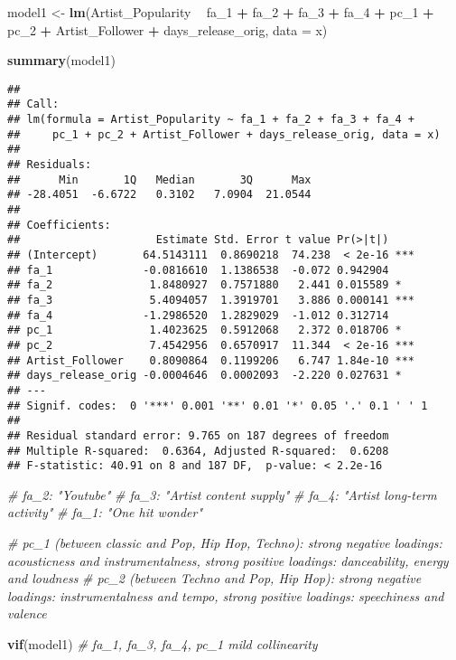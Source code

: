 \documentclass[
]{article}
\newenvironment{Shaded}{\begin{snugshade}}{\end{snugshade}}
\newcommand{\CommentTok}[1]{\textcolor[rgb]{0.56,0.35,0.01}{\textit{#1}}}
\newcommand{\DataTypeTok}[1]{\textcolor[rgb]{0.13,0.29,0.53}{#1}}
\newcommand{\DecValTok}[1]{\textcolor[rgb]{0.00,0.00,0.81}{#1}}
\newcommand{\KeywordTok}[1]{\textcolor[rgb]{0.13,0.29,0.53}{\textbf{#1}}}
\newcommand{\NormalTok}[1]{#1}
\newcommand{\OperatorTok}[1]{\textcolor[rgb]{0.81,0.36,0.00}{\textbf{#1}}}
\newcommand{\StringTok}[1]{\textcolor[rgb]{0.31,0.60,0.02}{#1}}
\begin{document}
\begin{Shaded}
\begin{Highlighting}[]
\NormalTok{model1 <-}\StringTok{ }\KeywordTok{lm}\NormalTok{(Artist_Popularity }\OperatorTok{~}\StringTok{ }\NormalTok{fa_}\DecValTok{1} \OperatorTok{+}\StringTok{ }\NormalTok{fa_}\DecValTok{2} \OperatorTok{+}\StringTok{ }\NormalTok{fa_}\DecValTok{3} \OperatorTok{+}\StringTok{ }\NormalTok{fa_}\DecValTok{4} \OperatorTok{+}\StringTok{ }\NormalTok{pc_}\DecValTok{1} \OperatorTok{+}\StringTok{ }\NormalTok{pc_}\DecValTok{2} \OperatorTok{+}\StringTok{ }\NormalTok{Artist_Follower }\OperatorTok{+}\StringTok{ }\NormalTok{days_release_orig, }\DataTypeTok{data =}\NormalTok{ x)}

\KeywordTok{summary}\NormalTok{(model1)}
\end{Highlighting}
\end{Shaded}

\begin{verbatim}
## 
## Call:
## lm(formula = Artist_Popularity ~ fa_1 + fa_2 + fa_3 + fa_4 + 
##     pc_1 + pc_2 + Artist_Follower + days_release_orig, data = x)
## 
## Residuals:
##      Min       1Q   Median       3Q      Max 
## -28.4051  -6.6722   0.3102   7.0904  21.0544 
## 
## Coefficients:
##                     Estimate Std. Error t value Pr(>|t|)    
## (Intercept)       64.5143111  0.8690218  74.238  < 2e-16 ***
## fa_1              -0.0816610  1.1386538  -0.072 0.942904    
## fa_2               1.8480927  0.7571880   2.441 0.015589 *  
## fa_3               5.4094057  1.3919701   3.886 0.000141 ***
## fa_4              -1.2986520  1.2829029  -1.012 0.312714    
## pc_1               1.4023625  0.5912068   2.372 0.018706 *  
## pc_2               7.4542956  0.6570917  11.344  < 2e-16 ***
## Artist_Follower    0.8090864  0.1199206   6.747 1.84e-10 ***
## days_release_orig -0.0004646  0.0002093  -2.220 0.027631 *  
## ---
## Signif. codes:  0 '***' 0.001 '**' 0.01 '*' 0.05 '.' 0.1 ' ' 1
## 
## Residual standard error: 9.765 on 187 degrees of freedom
## Multiple R-squared:  0.6364, Adjusted R-squared:  0.6208 
## F-statistic: 40.91 on 8 and 187 DF,  p-value: < 2.2e-16
\end{verbatim}

\begin{Shaded}
\begin{Highlighting}[]
\CommentTok{# fa_2: "Youtube"}
\CommentTok{# fa_3: "Artist content supply"}
\CommentTok{# fa_4: "Artist long-term activity"}
\CommentTok{# fa_1: "One hit wonder"}

\CommentTok{# pc_1 (between classic and Pop, Hip Hop, Techno): strong negative loadings: acousticness and instrumentalness, strong positive loadings: danceability, energy and loudness}
\CommentTok{# pc_2 (between Techno and Pop, Hip Hop): strong negative loadings: instrumentalness and tempo, strong positive loadings: speechiness and valence}

\KeywordTok{vif}\NormalTok{(model1) }\CommentTok{# fa_1, fa_3, fa_4, pc_1 mild collinearity}
\end{Highlighting}
\end{Shaded}
\end{document}
